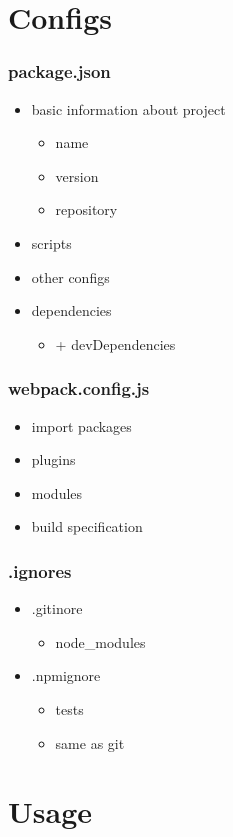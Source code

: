 \documentclass{beamer}
\begin{document}
\section{Configs}

\begin{frame}
\frametitle{package.json}
\begin{itemize}
\item basic information about project
\begin{itemize}
\item name
\item version
\item repository
\end{itemize}
\item scripts
\item other configs
\item dependencies
\begin{itemize}
\item + devDependencies
\end{itemize}
\end{itemize}
\end{frame}

\begin{frame}
\frametitle{webpack.config.js}
\begin{itemize}
\item import packages
\item plugins
\item modules
\item build specification
\end{itemize}
\end{frame}

\begin{frame}
\frametitle{.ignores}
\begin{itemize}
\item .gitinore
\begin{itemize}
\item node\_modules
\end{itemize}
\item .npmignore
\begin{itemize}
\item tests
\item same as git
\end{itemize}
\end{itemize}
\end{frame}



\section{Usage}
\end{document}
